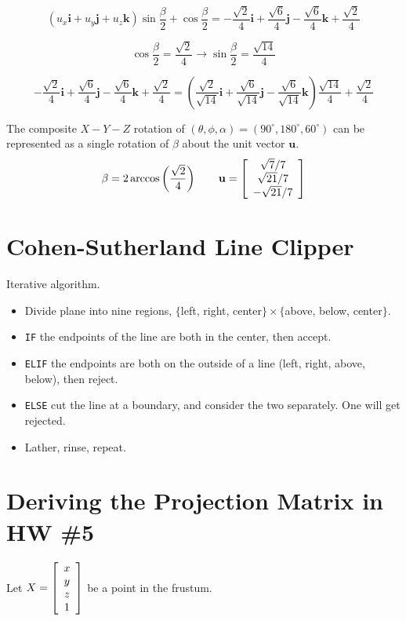 \documentclass[11pt]{article}
\begin{document}
\begin{spacing}{1.2}
$$
\left(u_x \mathbf{i} + u_y \mathbf{j} + u_z \mathbf{k} \right) \sin \frac{\beta}{2} + \cos \frac{\beta}{2} = 
-\frac{\sqrt2}{4}\mathbf{i}
+ \frac{\sqrt6}{4}\mathbf{j}
- \frac{\sqrt6}{4}\mathbf{k}
+ \frac{\sqrt2}{4}
$$

$$\cos \frac{\beta}{2} = \frac{\sqrt2}{4} \to \sin \frac{\beta}{2} = \frac{\sqrt{14}}{4}$$

$$
-\frac{\sqrt2}{4}\mathbf{i}
+ \frac{\sqrt6}{4}\mathbf{j}
- \frac{\sqrt6}{4}\mathbf{k}
+ \frac{\sqrt2}{4} = 
\left(
	\frac{\sqrt2}{\sqrt{14}} \mathbf{i} + 
	\frac{\sqrt6}{\sqrt{14}} \mathbf{j} -
	\frac{\sqrt6}{\sqrt{14}} \mathbf{k}
\right)
\frac{\sqrt{14}}{4} + \frac{\sqrt2}{4}
$$

The composite $X-Y-Z$ rotation of $(\theta,\phi,\alpha) = (90^{\circ}, 180^{\circ}, 60^{\circ})$ can be represented as a single rotation of $\beta$ about the unit vector $\mathbf{u}$. 
$$\beta = 2 \arccos\left( \frac{\sqrt2}{4} \right)
\qquad
\mathbf{u} = 
\left[
\begin{array}{c}
	\sqrt7/7 \cr
	\sqrt{21}/7\cr
	-\sqrt{21}/7 \cr
\end{array}
\right]
$$

\section{Cohen-Sutherland Line Clipper}

Iterative algorithm.

\begin{itemize}
	\item Divide plane into nine regions, $\{$left, right, center$\} \times \{$above, below, center$\}$.
	\item {\tt IF} the endpoints of the line are both in the center, then accept.  
	\item {\tt ELIF} the endpoints are both on the outside of a line (left, right, above, below), then reject.  
	\item {\tt ELSE} cut the line at a boundary, and consider the two separately.  One will get rejected.  
	\item Lather, rinse, repeat.  
\end{itemize}

\section{Deriving the Projection Matrix in HW \#5}

Let $X = 
\left[
	\begin{array}{c}
		x \cr y \cr z \cr 1 \cr
	\end{array}
\right]
$
be a point in the frustum.  


\end{spacing}
\end{document}

